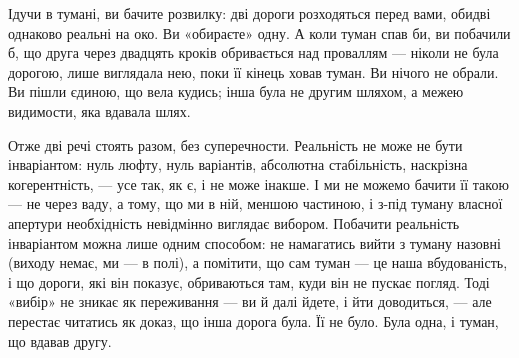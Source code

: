 \documentclass[12pt, a4paper, openany]{book}
\begin{document}
\begin{analogybox}
Ідучи в тумані, ви бачите розвилку: дві дороги розходяться перед вами, обидві однаково реальні на око. Ви «обираєте» одну. А коли туман спав би, ви побачили б, що друга через двадцять кроків обривається над проваллям --- ніколи не була дорогою, лише виглядала нею, поки її кінець ховав туман. Ви нічого не обрали. Ви пішли єдиною, що вела кудись; інша була не другим шляхом, а межею видимости, яка вдавала шлях.
\end{analogybox}

Отже дві речі стоять разом, без суперечности. Реальність не може не бути інваріантом: нуль люфту, нуль варіантів, абсолютна стабільність, наскрізна когерентність, --- усе так, як є, і не може інакше. І ми не можемо бачити її такою --- не через ваду, а тому, що ми в ній, меншою частиною, і з-під туману власної апертури необхідність невідмінно виглядає вибором. Побачити реальність інваріантом можна лише одним способом: не намагатись вийти з туману назовні (виходу немає, ми --- в полі), а помітити, що сам туман --- це наша вбудованість, і що дороги, які він показує, обриваються там, куди він не пускає погляд. Тоді «вибір» не зникає як переживання --- ви й далі йдете, і йти доводиться, --- але перестає читатись як доказ, що інша дорога була. Її не було. Була одна, і туман, що вдавав другу.
\end{document}
